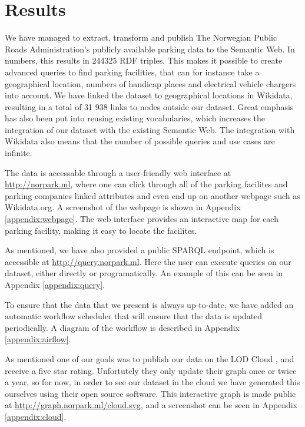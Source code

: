 \chapter{Results}
We have managed to extract, transform and publish The Norwegian Public Roads Administration's publicly available parking data to the Semantic Web. In numbers, this results in 244325 RDF triples. This makes it possible to create advanced queries to find parking facilities, that can for instance take a geographical location, numbers of handicap places and electrical vehicle chargers into account. We have linked the dataset to geographical locations in Wikidata, resulting in a total of 31 938 links to nodes outside our dataset. Great emphasis has also been put into reusing existing vocabularies, which increases the integration of our dataset with the existing Semantic Web. The integration with Wikidata also means that the number of possible queries and use cases are infinite.

\vspace{5mm}
The data is accessable through a user-friendly web interface at \url{http://norpark.ml}, where one can click through all of the parking facilites and parking companies linked attributes and even end up on another webpage such as Wikidata.org. A screenshot of the webpage is shown in Appendix \ref{appendix:webpage}. The web interface provides an interactive map for each parking facility, making it easy to locate the facilites.

\vspace{5mm}

As mentioned, we have also provided a public SPARQL endpoint, which is accessible at \url{http://query.norpark.ml}. Here the user can execute queries on our dataset, either directly or programatically. An example of this can be seen in Appendix \ref{appendix:query}.

\vspace{5mm}

To ensure that the data that we present is always up-to-date, we have added an automatic workflow scheduler that will ensure that the data is updated periodically. A diagram of the workflow is described in Appendix \ref{appendix:airflow}.

\vspace{5mm}

As mentioned one of our goals was to publish our data on the LOD Cloud \cite{lod-cloud}, and receive a five star rating. Unfortutely they only update their graph once or twice a year, so for now, in order to see our dataset in the cloud we have generated this ourselves using their open source software. This interactive graph is made public at \url{http://graph.norpark.ml/cloud.svg}, and a screenshot can be seen in Appendix \ref{appendix:cloud}.

